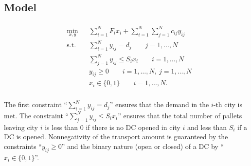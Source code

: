 \documentclass[11pt]{article}
\begin{document}
\subsection*{Model}
\begin{align*}
\begin{aligned}
  & \min_{x,y} & & \sum_{i=1}^N F_ix_i + \sum_{i=1}^N\sum_{j=1}^Nc_{ij}y_{ij}\\
  & \text{s.t.}
        & & \sum_{i=1}^N y_{ij} = d_{j} \qquad j=1,\dots,N\\
  & & & \sum_{j=1}^N y_{ij} \leq S_ix_i \qquad i=1,\dots,N\\
  & & & y_{ij} \geq 0 \qquad i=1,\dots,N,\ j=1,\dots,N\\
  & & & x_i \in \{0,1\} \qquad i=1,\dots,N.
\end{aligned}
\end{align*}\\
The first constraint ``$\sum_{i=1}^N y_{ij} = d_{j}$'' ensures that the demand in the $i$-th city is met. The constraint ``$\sum_{j=1}^N y_{ij} \leq S_ix_i$'' ensures that the total number of pallets leaving city $i$ is less than $0$ if there is no DC opened in city $i$ and less than $S_i$ if a DC is opened. Nonnegativity of the transport amount is guaranteed by the constraints ``$y_{ij} \geq 0$'' and the binary nature (open or closed) of a DC by ``$x_i \in \{0,1\}$''.
\end{document}
